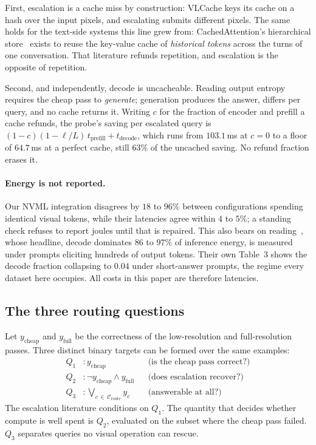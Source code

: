 \documentclass[10pt,twocolumn]{article}
\theoremstyle{plain}
\begin{document}
First, escalation is a cache miss by construction: VLCache keys its cache on a
hash over the input pixels, and escalating submits different pixels. The same
holds for the text-side systems this line grew from: CachedAttention's
hierarchical store~\cite{cachedattention} exists to reuse the key-value cache of
\emph{historical tokens} across the turns of one conversation. That literature
refunds repetition, and escalation is the opposite of repetition.

Second, and independently, decode is uncacheable. Reading output entropy
requires the cheap pass to \emph{generate}; generation produces the answer,
differs per query, and no cache returns it. Writing $c$ for the fraction of
encoder and prefill a cache refunds, the probe's saving per escalated query is
$(1-c)(1-\ell/L)\,t_{\text{prefill}} + t_{\text{decode}}$, which runs from
$103.1$\,ms at $c=0$ to a floor of $64.7$\,ms at a perfect cache, still $63\%$
of the uncached saving. No refund fraction erases it.

\paragraph{Energy is not reported.} Our NVML integration disagrees by
$18$ to $96\%$ between configurations spending identical visual tokens, while
their latencies agree within $4$ to $5\%$; a standing check refuses to report
joules until that is repaired. This also bears on reading~\cite{energy}, whose
headline, decode dominates $86$ to $97\%$ of inference energy, is measured
under prompts eliciting hundreds of output tokens. Their own Table~3 shows the
decode fraction collapsing to $0.04$ under short-answer prompts, the regime
every dataset here occupies. All costs in this paper are therefore latencies.

\subsection{The three routing questions}
\label{sec:two-questions}

Let $y_{\text{cheap}}$ and $y_{\text{full}}$ be the correctness of the
low-resolution and full-resolution passes. Three distinct binary targets can be
formed over the same examples:
\begin{align}
Q_1 &: y_{\text{cheap}} &&\text{(is the cheap pass correct?)}\\
Q_2 &: \lnot y_{\text{cheap}} \wedge y_{\text{full}} &&\text{(does escalation recover?)}\\
Q_3 &: \textstyle\bigvee_{c\,\in\,\mathcal{C}_{\text{route}}} y_c &&\text{(answerable at all?)}
\end{align}
The escalation literature conditions on $Q_1$. The quantity that decides
whether compute is well spent is $Q_2$, evaluated on the subset where the cheap
pass failed. $Q_3$ separates queries no visual operation can rescue.
\end{document}
